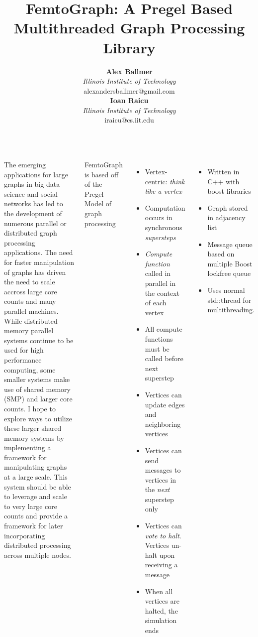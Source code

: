 \documentclass[25pt, portrait,  margin=0mm, innermargin=15mm,
  blockverticalspace=15mm, colspace=15mm, subcolspace=8mm]{tikzposter}
\title{FemtoGraph: A Pregel Based Multithreaded
  Graph Processing Library}
\author{
  \textbf{Alex Ballmer}\\
  \textit{Illinois Institute of Technology}\\
  alexandersballmer@gmail.com\\
  \textbf{Ioan Raicu}\\
  \textit{Illinois Institute of Technology}\\
  iraicu@cs.iit.edu\\
}
\begin{document}
\maketitle

\begin{columns}
     {


  The emerging applications for large graphs in big data science and social networks has led to the development of numerous parallel or distributed graph processing applications. The need for faster manipulation of graphs has driven the need to scale accross large core counts and many parallel machines. While distributed memory parallel systems continue to be used for high performance computing, some smaller systems make use of shared memory (SMP) and larger core counts. I hope to explore ways to utilize these larger shared memory systems by implementing a framework for manipulating graphs at a large scale. This system should be able to leverage and scale to very large core counts and provide a framework for later incorporating distributed processing across multiple nodes.
}


     {
      FemtoGraph is based off of the Pregel Model of graph processing

      \begin{itemize}
      \item Vertex-centric: \textit{think like a vertex}
      \item Computation occurs in synchronous \textit{supersteps}
      \item \textit{Compute function} called in parallel in the context of each vertex
      \item All compute functions must be called before next superstep
      \item Vertices can update edges and neighboring vertices
      \item Vertices can send messages to vertices in the \textit{next} superstep only
      \item Vertices can \textit{vote to halt}. Vertices un-halt upon receiving a message
      \item When all vertices are halted, the simulation ends
      \end{itemize}
      
      }

     {

      \begin{itemize}
      \item Written in C++ with boost libraries
      \item Graph stored in adjacency list
      \item Message queue based on multiple Boost lockfree queue
      \item Uses normal std::thread for multithreading.
      \end{itemize}


}
\end{columns}
\end{document}
